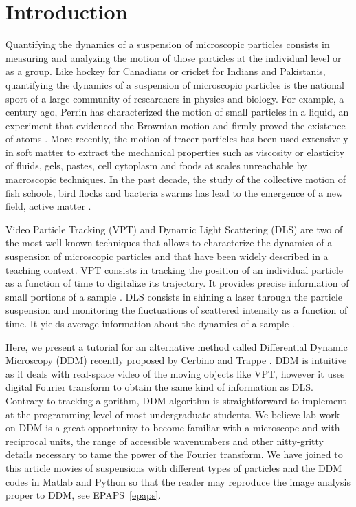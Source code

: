 \documentclass[prb,reprint,amsmath,amssymb]{revtex4-1}
\begin{document}
\section{\label{sec:level1}Introduction}

Quantifying the dynamics of a suspension of microscopic particles consists in measuring and analyzing the motion of those particles at the individual level or as a group. Like hockey for Canadians or cricket for Indians and Pakistanis, quantifying the dynamics of a suspension of microscopic particles is the national sport of a large community of researchers in physics and biology. For example, a century ago, Perrin has characterized the motion of small particles in a liquid, an experiment that evidenced the Brownian motion and firmly proved the existence of atoms \cite{22_perrin2014atomes}. More recently, the motion of tracer particles has been used extensively in soft matter\cite{pt1990witten, pt1964reiner} to extract the mechanical properties such as viscosity or elasticity of fluids, gels\cite{Mason1997, Chen2010}, pastes, cell cytoplasm\cite{Fabry2001,Lau2003} and foods at scales unreachable by macroscopic techniques. In the past decade, the study of the collective motion of fish schools, bird flocks and bacteria swarms has lead to the emergence of a new field, active matter \cite{Bricard2013}.

Video Particle Tracking (VPT) and Dynamic Light Scattering (DLS) are two of the most well-known techniques that allows to characterize the dynamics of a suspension of microscopic particles and that have been widely described in a teaching context. VPT consists in tracking the position of an individual particle as a function of time to digitalize its trajectory. It provides precise information of small portions of a sample \citep{Crocker1996,ajp2013catipovic,Maurer2014}. DLS consists in shining a laser through the particle suspension and monitoring the fluctuations of scattered intensity as a function of time\cite{ajp1969clark}. It yields average information about the dynamics of a sample \citep{18_sartor2003dynamic, ajp1999goldburg,ajp1969clark}.

Here, we present a tutorial for an alternative method called Differential Dynamic Microscopy (DDM) recently proposed by Cerbino and Trappe \cite{2_DDM}. DDM is intuitive as it deals with real-space video of the moving objects like VPT, however it uses digital Fourier transform to obtain the same kind of information as DLS.  Contrary to tracking algorithm, DDM algorithm is straightforward to implement at the programming level of most undergraduate students. We believe lab work on DDM is a great opportunity to become familiar with a microscope and with reciprocal units, the range of accessible wavenumbers and other nitty-gritty details necessary to tame the power of the Fourier transform\cite{ajp1976higgins, ajp2001whiford}. We have joined to this article movies of suspensions with different types of particles and the DDM codes in Matlab and Python so that the reader may reproduce the image analysis proper to DDM, see EPAPS~\ref{epaps}.
\end{document}
